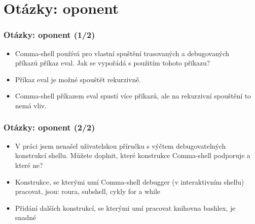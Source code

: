 \documentclass{beamer}
\newcommand{\backupend}{
   \setcounter{framenumber}{\value{finalframe}}
}
\begin{document}
\section{Otázky: oponent}

\begin{frame}
	\frametitle{Otázky: oponent (1/2)}
	\begin{exampleblock}{}
		\begin{itemize}
			\item Comma-shell používá pro vlastní spuštění trasovaných a debugovaných příkazů příkaz eval.
Jak se vypořádá s použitím tohoto příkazu?
		\end{itemize}
	\end{exampleblock}
	\begin{alertblock}{}
	   \begin{itemize}
			\item Příkaz eval je možné spouštět rekurzivně.
			\item Comma-shell příkazem eval spustí více příkazů, ale na rekurzivní spouštění to nemá vliv.
		\end{itemize}
	\end{alertblock}	
\end{frame}

\begin{frame}
	\frametitle{Otázky: oponent (2/2)}
	\begin{exampleblock}{}
		\begin{itemize}
			\item V práci jsem nenašel uživatelskou příručku s výčtem debugovatelných konstrukcí shellu.
Můžete doplnit, které konstrukce Comma-shell podporuje a které ne?
		\end{itemize}
	\end{exampleblock}
	\begin{alertblock}{}
	   \begin{itemize}
			\item Konstrukce, se kterými umí Comma-shell debugger (v interaktivním shellu) pracovat, jsou: roura, subshell, cykly for a while
			\item Přidání dalších konstrukcí, se kterými umí pracovat knihovna bashlex, je snadné
		\end{itemize}
	\end{alertblock}	
\end{frame}


\backupend
\end{document}
